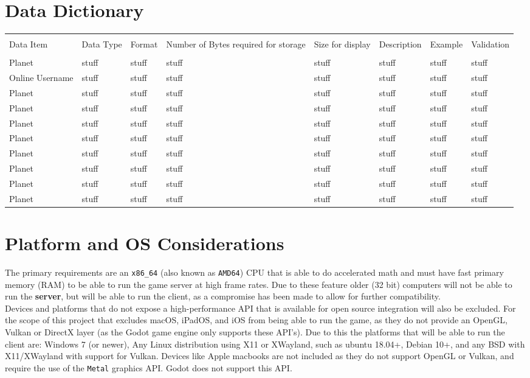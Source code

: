 \documentclass[12pt, DIV=calc]{scrartcl}
\begin{document}
\section{Data Dictionary}
\begin{xltabular}[c]{\textwidth}{| X | X | X | X | X | X | X | X |}
    \hline \\
Data Item & Data Type & Format & Number of Bytes required for storage & Size for display & Description  & Example & Validation \\
    \hline \hline \\
Planet & stuff & stuff & stuff & stuff & stuff & stuff & stuff \\ \hline
Online Username & stuff & stuff & stuff & stuff & stuff & stuff & stuff \\ \hline
Planet & stuff & stuff & stuff & stuff & stuff & stuff & stuff \\ \hline
Planet & stuff & stuff & stuff & stuff & stuff & stuff & stuff \\ \hline
Planet & stuff & stuff & stuff & stuff & stuff & stuff & stuff \\ \hline
Planet & stuff & stuff & stuff & stuff & stuff & stuff & stuff \\ \hline
Planet & stuff & stuff & stuff & stuff & stuff & stuff & stuff \\ \hline
Planet & stuff & stuff & stuff & stuff & stuff & stuff & stuff \\ \hline
Planet & stuff & stuff & stuff & stuff & stuff & stuff & stuff \\ \hline
Planet & stuff & stuff & stuff & stuff & stuff & stuff & stuff \\ \hline
    \hline
\end{xltabular}

\section{Platform and OS Considerations}
The primary requirements are an \texttt{x86\_64} (also known as \texttt{AMD64}) CPU that is able to do accelerated math and must have fast primary memory (RAM) to be able to run the game server at high frame rates. Due to these feature older (32 bit) computers will not be able to run the \textbf{server}, but will be able to run the client, as a compromise has been made to allow for further compatibility. \\

\noindent Devices and platforms that do not expose a high-performance API that is available for open source integration will also be excluded. For the scope of this project that excludes macOS, iPadOS, and iOS from being able to run the game, as they do not provide an OpenGL, Vulkan or DirectX layer (as the Godot game engine only supports these API's). Due to this the platforms that will be able to run the client are: Windows 7 (or newer), Any Linux distribution using X11 or XWayland, such as ubuntu 18.04+, Debian 10+, and any BSD with X11/XWayland with support for Vulkan. Devices like Apple macbooks are not included as they do not support OpenGL or Vulkan, and require the use of the \texttt{Metal} graphics API. Godot does not support this API. \\
\end{document}

